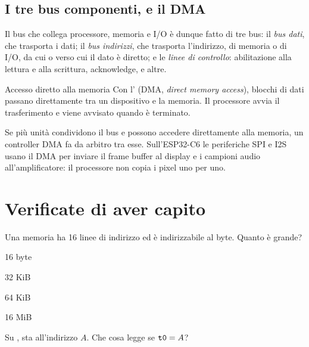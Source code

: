 \subsection{I tre bus componenti, e il DMA}

Il bus che collega processore, memoria e I/O è dunque fatto di tre bus: il
\emph{bus dati}, che trasporta i dati; il \emph{bus indirizzi}, che trasporta
l'indirizzo, di memoria o di I/O, da cui o verso cui il dato è diretto; e le
\emph{linee di controllo}: abilitazione alla lettura e alla scrittura,
acknowledge, e altre.

\begin{definition}{Accesso diretto alla memoria}
Con l' (DMA, \emph{direct memory access}),
blocchi di dati passano direttamente tra un dispositivo e la memoria. Il
processore avvia il trasferimento e viene avvisato quando è terminato.
\end{definition}

Se più unità condividono il bus e possono accedere direttamente alla memoria,
un controller DMA fa da arbitro tra esse. Sull'ESP32-C6 le periferiche SPI e
I2S usano il DMA per inviare il frame buffer al display e i campioni audio
all'amplificatore: il processore non copia i pixel uno per uno.





\section{Verificate di aver capito}

\begin{quiz}{Una memoria ha 16 linee di indirizzo ed è indirizzabile al byte. Quanto è grande?}
\item 16 byte
\item 32 KiB
\item 64 KiB
\item 16 MiB
\end{quiz}

\begin{quiz}{Su \riscv,  sta all'indirizzo $A$. Che cosa legge  se $\texttt{t0}=A$?}
\item {}
\item {}
\item {}
\item {}
\end{quiz}

